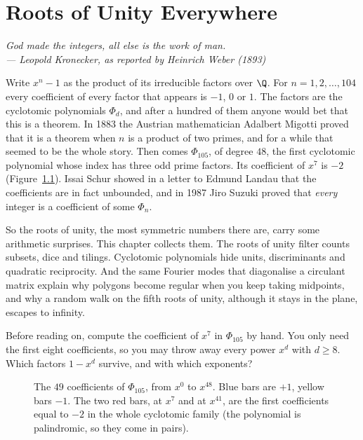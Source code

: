 \chapter{Roots of Unity Everywhere}

\begin{center}\itshape
God made the integers, all else is the work of man.\\
\upshape --- Leopold Kronecker, as reported by Heinrich Weber (1893)
\end{center}

Write $x^n-1$ as the product of its irreducible factors over $\Q$. For $n=1,2,\dots,104$ every coefficient of every factor
that appears is $-1$, $0$ or $1$. The factors are the cyclotomic polynomials $\Phi_d$, and after a hundred of them anyone
would bet that this is a theorem. In 1883 the Austrian mathematician Adalbert Migotti proved that it is a theorem when $n$
is a product of two primes, and for a while that seemed to be the whole story. Then comes $\Phi_{105}$, of degree $48$, the
first cyclotomic polynomial whose index has three odd prime factors. Its coefficient of $x^7$ is $-2$ (Figure~\ref{fig:phi105}).
Issai Schur showed in a letter to Edmund Landau that the coefficients are in fact unbounded, and in 1987 Jiro Suzuki proved
that \emph{every} integer is a coefficient of some $\Phi_n$.

So the roots of unity, the most symmetric numbers there are, carry some arithmetic surprises. This chapter collects them.
The roots of unity filter counts subsets, dice and tilings. Cyclotomic polynomials hide units, discriminants and quadratic
reciprocity. And the same Fourier modes that diagonalise a circulant matrix explain why polygons become regular when you
keep taking midpoints, and why a random walk on the fifth roots of unity, although it stays in the plane, escapes to
infinity.

\begin{think}
Before reading on, compute the coefficient of $x^7$ in $\Phi_{105}$ by hand. You only need the first eight coefficients, so
you may throw away every power $x^d$ with $d\ge8$. Which factors $1-x^d$ survive, and with which exponents?
\end{think}

\begin{figure}[ht]
\centering
{}
\caption{The $49$ coefficients of $\Phi_{105}$, from $x^0$ to $x^{48}$. Blue bars are $+1$, yellow bars $-1$. The two red bars, at $x^7$
and at $x^{41}$, are the first coefficients equal to $-2$ in the whole cyclotomic family (the polynomial is palindromic, so
they come in pairs).}
\label{fig:phi105}
\end{figure}

